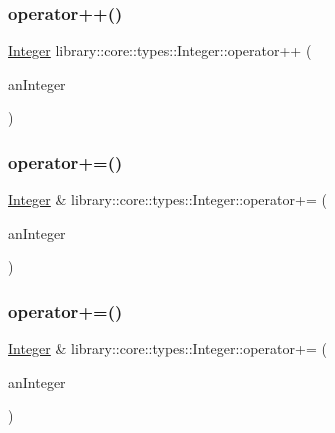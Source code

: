 \mbox{\label{classlibrary_1_1core_1_1types_1_1_integer_a10dd68fe912b11ba68840f9c1fdb6ffa}} 
\subsubsection{\texorpdfstring{operator++()}{operator++()}\hspace{0.1cm}{\footnotesize\ttfamily [2/2]}}
{\footnotesize\ttfamily \mbox{\hyperlink{classlibrary_1_1core_1_1types_1_1_integer}{Integer}} library\+::core\+::types\+::\+Integer\+::operator++ (\begin{DoxyParamCaption}\item[{int}]{an\+Integer }\end{DoxyParamCaption})}

\mbox{\label{classlibrary_1_1core_1_1types_1_1_integer_aeadb166badac8d39b41f9a5419dbc1cc}} 
\subsubsection{\texorpdfstring{operator+=()}{operator+=()}\hspace{0.1cm}{\footnotesize\ttfamily [1/2]}}
{\footnotesize\ttfamily \mbox{\hyperlink{classlibrary_1_1core_1_1types_1_1_integer}{Integer}} \& library\+::core\+::types\+::\+Integer\+::operator+= (\begin{DoxyParamCaption}\item[{const \mbox{\hyperlink{classlibrary_1_1core_1_1types_1_1_integer}{Integer}} \&}]{an\+Integer }\end{DoxyParamCaption})}

\mbox{\label{classlibrary_1_1core_1_1types_1_1_integer_a499066287116e506a750e7a55d390a6d}} 
\subsubsection{\texorpdfstring{operator+=()}{operator+=()}\hspace{0.1cm}{\footnotesize\ttfamily [2/2]}}
{\footnotesize\ttfamily \mbox{\hyperlink{classlibrary_1_1core_1_1types_1_1_integer}{Integer}} \& library\+::core\+::types\+::\+Integer\+::operator+= (\begin{DoxyParamCaption}\item[{const \mbox{\hyperlink{classlibrary_1_1core_1_1types_1_1_integer_a623afb1580f870fd8a1997b1c12c917d}{Integer\+::\+Value\+Type}} \&}]{an\+Integer }\end{DoxyParamCaption})}


